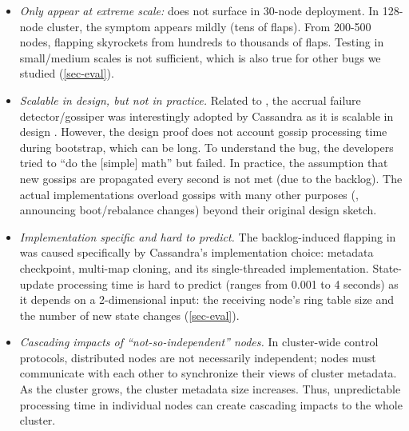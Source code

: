 \begin{itemize}
\item {\em Only appear at extreme scale:} \caone does not surface in 30-node
deployment.  In 128-node cluster, the symptom appears mildly (tens of
flaps).  From 200-500 nodes, flapping skyrockets from hundreds to 
thousands of flaps.  Testing in small/medium scales is not sufficient,
which is also true for other bugs we studied (\sec\ref{sec-eval}).





\item {\em Scalable in design, but not in practice.}  Related to \caone,
the accrual failure detector/gossiper
\cite{Hayashibara+04-PhiFailureDetector} was interestingly adopted by
Cassandra as it is scalable in design \cite{Lakshman+09-Cassandra}.
However, the design proof does not account gossip processing time during
bootstrap, which can be long.  To understand the bug, the developers tried
to ``do the [simple] math'' \cite{CA-One} but failed.  In practice, the
assumption that new gossips are propagated every second is not met (due to
the backlog).  The actual implementations overload gossips with many other
purposes (\eg, announcing boot/rebalance changes) beyond their original
design sketch.



\item {\em Implementation specific and hard to predict.}  The
backlog-induced flapping in \caone was caused specifically by Cassandra's
implementation choice: metadata checkpoint, multi-map cloning, and its
single-threaded implementation.  State-update processing time is hard to
predict (ranges from 0.001 to 4 seconds) as it depends on a 2-dimensional
input: the receiving node's ring table size and the number of new
state changes (\sec\ref{sec-eval}).


\item {\em Cascading impacts of ``not-so-independent'' nodes.}  In 
cluster-wide control protocols, distributed nodes are  not
necessarily independent; nodes must communicate with each other
to synchronize their views of cluster metadata.  As the cluster grows, the
cluster metadata size increases.  Thus, unpredictable processing time in
individual nodes can create cascading impacts to the whole cluster.



\end{itemize}
